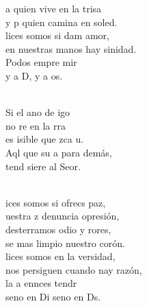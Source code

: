 \documentclass[12pt]{article}
\begin{document}
\begin{multicols*}{2}
\begin{cancion}[Bienaventuranzas][Kairoi]
	a quien vive en la trisa\\
	y p quien camina en soled.\\
	lices somos si dam amor,\\
	en nuestras manos hay sinidad.\\
	Podos empre mir\\
	y  a D, y  a os.\\\jump\\
	\begin{chorus}%
	Si el ano de igo \\
	no re en la rra\\
	es isible que zca u.\\
	Aql que  su a para  demás,\\
	tend siere al Seor.\\
	\end{chorus}%
	\jump\\
	ices somos si ofrecs paz,\\
	uestra z denuncia  opresión,\\
	desterramos odio y rores,\\
	se mas limpio nuestro corón.\\
	lices somos en la versidad,\\
	nos persiguen cuando nay razón,\\
	la a ennces tendr\\
	seno en Di seno en Ds.\\
\end{cancion}%


\end{multicols*}
\end{document}
